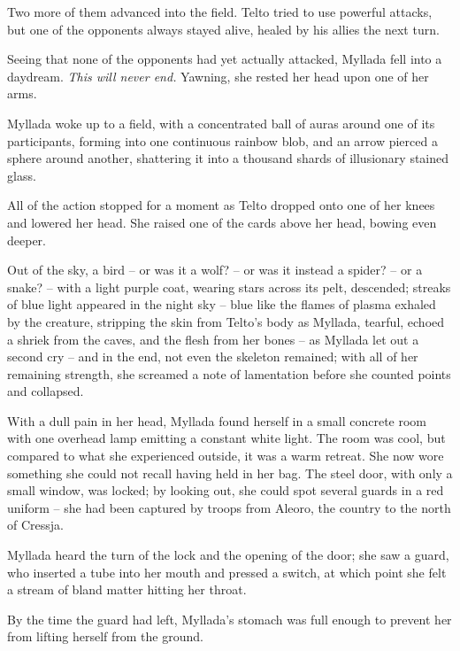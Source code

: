 Two more of them advanced into the field. Telto tried to use powerful attacks, but one of the opponents always stayed alive, healed by his allies the next turn.

Seeing that none of the opponents had yet actually attacked, Myllada fell into a daydream. \emph{This will never end.} Yawning, she rested her head upon one of her arms.

\centeredstars

Myllada woke up to a field, with a concentrated ball of auras around one of its participants, forming into one continuous rainbow blob, and an arrow pierced a sphere around another, shattering it into a thousand shards of illusionary stained glass.

All of the action stopped for a moment as Telto dropped onto one of her knees and lowered her head. She raised one of the cards above her head, bowing even deeper.

Out of the sky, a bird -- or was it a wolf? -- or was it instead a spider? -- or a snake? -- with a light purple coat, wearing stars across its pelt, descended; streaks of blue light appeared in the night sky -- blue like the flames of plasma exhaled by the creature, stripping the skin from Telto's body as Myllada, tearful, echoed a shriek from the caves, and the flesh from her bones -- as Myllada let out a second cry -- and in the end, not even the skeleton remained; with all of her remaining strength, she screamed a note of lamentation before she counted \iformthree{} points and collapsed.

\centeredstars

With a dull pain in her head, Myllada found herself in a small concrete room with one overhead lamp emitting a constant white light. The room was cool, but compared to what she experienced outside, it was a warm retreat. She now wore something she could not recall having held in her bag. The steel door, with only a small window, was locked; by looking out, she could spot several guards in a red uniform -- she had been captured by troops from Aleoro, the country to the north of Cressja.

Myllada heard the turn of the lock and the opening of the door; she saw a guard, who inserted a tube into her mouth and pressed a switch, at which point she felt a stream of bland matter hitting her throat.

By the time the guard had left, Myllada's stomach was full enough to prevent her from lifting herself from the ground.

